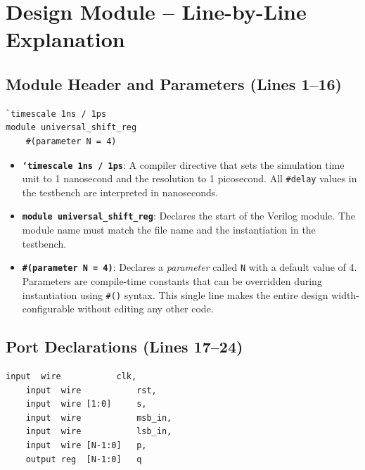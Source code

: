 \documentclass[12pt,a4paper]{report}
\begin{document}
\section{Design Module -- Line-by-Line Explanation}

\subsection{Module Header and Parameters (Lines 1--16)}

\begin{lstlisting}[firstnumber=1, caption={Module header with \texttt{timescale} and parameterisation}]
`timescale 1ns / 1ps
module universal_shift_reg
    #(parameter N = 4)
\end{lstlisting}

\begin{itemize}
    \item \textbf{\texttt{`timescale 1ns / 1ps}}: A compiler directive that sets the simulation time unit to 1 nanosecond and the resolution to 1 picosecond. All \texttt{\#delay} values in the testbench are interpreted in nanoseconds.
    \item \textbf{\texttt{module universal\_shift\_reg}}: Declares the start of the Verilog module. The module name must match the file name and the instantiation in the testbench.
    \item \textbf{\texttt{\#(parameter N = 4)}}: Declares a \textit{parameter} called \texttt{N} with a default value of 4. Parameters are compile-time constants that can be overridden during instantiation using \texttt{\#()} syntax. This single line makes the entire design width-configurable without editing any other code.
\end{itemize}

\subsection{Port Declarations (Lines 17--24)}

\begin{lstlisting}[firstnumber=17, caption={Port declaration section}]
    input  wire           clk,
    input  wire           rst,
    input  wire [1:0]     s,
    input  wire           msb_in,
    input  wire           lsb_in,
    input  wire [N-1:0]   p,
    output reg  [N-1:0]   q
\end{lstlisting}
\end{document}
